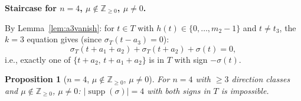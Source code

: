 \documentclass{article}
\newtheorem{prop}{Proposition}
\begin{document}
\medskip
\noindent\textbf{Staircase for $n=4$, $\mu\notin\mathbb{Z}_{\ge 0}$, $\mu\ne 0$.}

By Lemma~\ref{lem:a3vanish}: for $t\in T$ with $h(t)\in\{0,\dots,m_2-1\}$ and $t\ne t_3$,
the $k=3$ equation gives (since $\sigma_T(t-a_3)=0$):
\begin{equation}\label{eq:3term4}
  \sigma_T(t+a_1+a_2)+\sigma_T(t+a_2)+\sigma(t)=0,
\end{equation}
i.e., exactly one of $\{t+a_2,\,t+a_1+a_2\}$ is in $T$ with sign $-\sigma(t)$.

\begin{prop}[$n=4$, $\mu\notin\mathbb{Z}_{\ge 0}$, $\mu\ne 0$]\label{prop:n4mu}
For $n=4$ with $\ge 3$ direction classes and $\mu\notin\mathbb{Z}_{\ge 0}$, $\mu\ne 0$:
$|\operatorname{supp}(\sigma)|=4$ with both signs in $T$ is impossible.
\end{prop}
\end{document}
